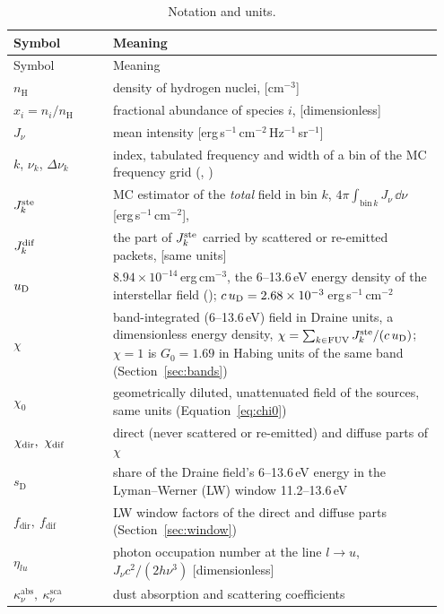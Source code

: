 \begin{longtable}{@{}L{0.22\linewidth}L{0.73\linewidth}@{}}
\caption{Notation and units.}\label{tab:notation}\\
\toprule
Symbol & Meaning \\
\midrule
\endfirsthead
\toprule
Symbol & Meaning \\
\midrule
\endhead
$n_{\mathrm H}$ & density of hydrogen nuclei,  [cm$^{-3}$] \\
$x_i = n_i/n_{\mathrm H}$ & fractional abundance of species $i$,  [dimensionless] \\
$J_\nu$ & mean intensity [erg\,s$^{-1}$\,cm$^{-2}$\,Hz$^{-1}$\,sr$^{-1}$] \\
$k$, $\nu_k$, $\Delta\nu_k$ & index, tabulated frequency and width of a bin of the MC frequency grid
            (, ) \\
$J^{\mathrm{ste}}_k$ & MC estimator of the \emph{total} field in bin $k$,
            $4\pi\int_{\mathrm{bin}\,k} J_\nu\,\dd\nu$ [erg\,s$^{-1}$\,cm$^{-2}$],  \\
$J^{\mathrm{dif}}_k$ & the part of $J^{\mathrm{ste}}_k$ carried by scattered or re-emitted packets,  [same units] \\
$u_{\mathrm{D}}$ & $8.94\times10^{-14}$\,erg\,cm$^{-3}$, the 6--13.6\,eV energy density of the
        \citet{Draine1978} interstellar field ();
        $c\,u_{\mathrm{D}}=2.68\times10^{-3}$\,erg\,s$^{-1}$\,cm$^{-2}$ \\
$\chi$ & band-integrated (6--13.6\,eV) field in Draine units, a dimensionless energy density,
         $\chi = \sum_{k\in\mathrm{FUV}} J^{\mathrm{ste}}_k/(c\,u_{\mathrm{D}})$; $\chi=1$ is $G_0=1.69$ in
         Habing units of the same band (Section~\ref{sec:bands}) \\
$\chi_0$ & geometrically diluted, unattenuated field of the sources, same units (Equation~\ref{eq:chi0}) \\
$\chi_{\mathrm{dir}},\ \chi_{\mathrm{dif}}$ & direct (never scattered or re-emitted) and diffuse parts of $\chi$ \\
$s_{\mathrm D}$ & share of the Draine field's 6--13.6\,eV energy in the Lyman--Werner (LW) window 11.2--13.6\,eV \\
$f_{\mathrm{dir}},\ f_{\mathrm{dif}}$ & LW window factors of the direct and diffuse parts (Section~\ref{sec:window}) \\
$\eta_{lu}$ & photon occupation number at the line $l\to u$, $J_\nu c^2/(2h\nu^3)$ [dimensionless] \\
$\kappa^{\mathrm{abs}}_\nu,\ \kappa^{\mathrm{sca}}_\nu$ & dust absorption and scattering coefficients

\end{longtable}
